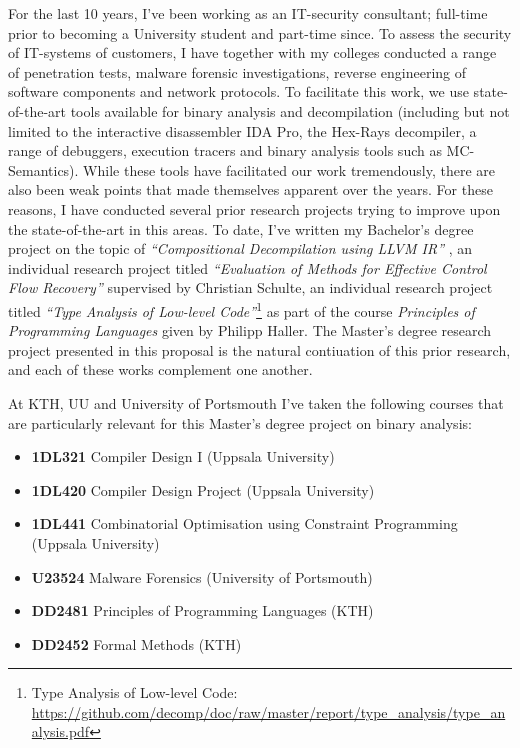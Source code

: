 \documentclass[12pt, a4paper]{article}
\begin{document}
For the last 10 years, I've been working as an IT-security consultant; full-time prior to becoming a University student and part-time since. To assess the security of IT-systems of customers, I have together with my colleges conducted a range of penetration tests, malware forensic investigations, reverse engineering of software components and network protocols. To facilitate this work, we use state-of-the-art tools available for binary analysis and decompilation (including but not limited to the interactive disassembler IDA Pro, the Hex-Rays decompiler, a range of debuggers, execution tracers and binary analysis tools such as MC-Semantics). While these tools have facilitated our work tremendously, there are also been weak points that made themselves apparent over the years. For these reasons, I have conducted several prior research projects trying to improve upon the state-of-the-art in this areas. To date, I've written my Bachelor's degree project on the topic of \textit{``Compositional Decompilation using LLVM IR''} \cite{compositional_decompilation}, an individual research project titled \textit{``Evaluation of Methods for Effective Control Flow Recovery''} supervised by Christian Schulte, an individual research project titled \textit{``Type Analysis of Low-level Code''}\footnote{Type Analysis of Low-level Code: \url{https://github.com/decomp/doc/raw/master/report/type_analysis/type_analysis.pdf}} as part of the course \textit{Principles of Programming Languages} given by Philipp Haller. The Master's degree research project presented in this proposal is the natural contiuation of this prior research, and each of these works complement one another.

At KTH, UU and University of Portsmouth I've taken the following courses that are particularly relevant for this Master's degree project on binary analysis:

\begin{itemize}
	\item \textbf{1DL321} Compiler Design I (Uppsala University)
	\item \textbf{1DL420} Compiler Design Project (Uppsala University)
	\item \textbf{1DL441} Combinatorial Optimisation using Constraint Programming (Uppsala University)
	\item \textbf{U23524} Malware Forensics (University of Portsmouth)
	\item \textbf{DD2481} Principles of Programming Languages (KTH)
	\item \textbf{DD2452} Formal Methods (KTH)
\end{itemize}
\end{document}
